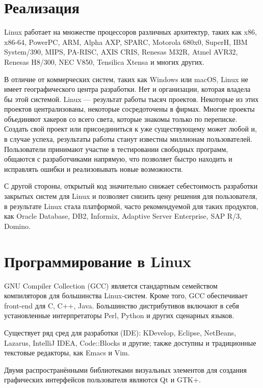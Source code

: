 \chapter*{Реализация}
Linux работает на множестве процессоров различных архитектур, таких как x86, x86-64, PowerPC, ARM, Alpha AXP, SPARC, Motorola 680x0, SuperH, IBM System/390, MIPS, PA-RISC, AXIS CRIS, Renesas M32R, Atmel AVR32, Renesas H8/300, NEC V850, Tensilica Xtensa и многих других.

В отличие от коммерческих систем, таких как Windows или macOS, Linux не имеет географического центра разработки. Нет и организации, которая владела бы этой системой. Linux — результат работы тысяч проектов. Некоторые из этих проектов централизованы, некоторые сосредоточены в фирмах. Многие проекты объединяют хакеров со всего света, которые знакомы только по переписке. Создать свой проект или присоединиться к уже существующему может любой и, в случае успеха, результаты работы станут известны миллионам пользователей. Пользователи принимают участие в тестировании свободных программ, общаются с разработчиками напрямую, что позволяет быстро находить и исправлять ошибки и реализовывать новые возможности.

С другой стороны, открытый код значительно снижает себестоимость разработки закрытых систем для Linux и позволяет снизить цену решения для пользователя, в результате Linux стала платформой, часто рекомендуемой для таких продуктов, как Oracle Database, DB2, Informix, Adaptive Server Enterprise, SAP R/3, Domino.

\chapter*{Программирование в Linux}

GNU Compiler Collection (GCC) является стандартным семейством компиляторов для большинства Linux-систем. Кроме того, GCC обеспечивает front-end для C, C++, Java. Большинство дистрибутивов включают в себя установленные интерпретаторы Perl, Python и других сценарных языков.

Существует ряд сред для разработки (IDE): KDevelop, Eclipse, NetBeans, Lazarus, IntelliJ IDEA, Code::Blocks и другие; также доступны и традиционные текстовые редакторы, как Emacs и Vim.

Двумя распространёнными библиотеками визуальных элементов для создания графических интерфейсов пользователя являются Qt и GTK+.

